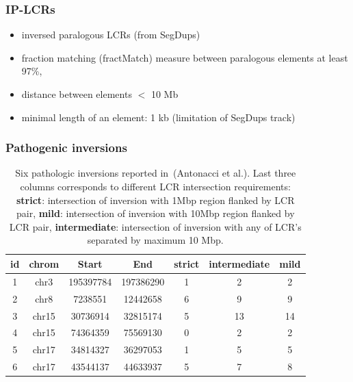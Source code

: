 \begin{frame}\frametitle{IP-LCRs}  
\begin{itemize}
 \item inversed paralogous LCRs (from SegDups)
 \item fraction matching (fractMatch) measure between paralogous elements at least 97\%, 
 \item distance between elements $<$ 10 Mb 
 \item minimal length of an element: 1 kb (limitation of SegDups track)
\end{itemize}
\end{frame}


\begin{frame}\frametitle{Pathogenic inversions}  
\begin{table}[t!]
\caption[Six pathologic inversions~ from~\cite{antonacci}]{Six pathologic inversions reported in~(Antonacci et al.). Last three columns corresponds to different LCR intersection requirements:
\textbf{strict}: intersection of inversion with 1Mbp region flanked by LCR pair, \textbf{mild}: intersection of inversion with 10Mbp region flanked by LCR pair, 
\textbf{intermediate}: intersection of inversion with any of LCR's separated by maximum 10 Mbp.
}
\label{t:six}
\begin{center}
\begin{tabular}{c|c|c|c|c|c|c}
id & chrom & Start & End & strict & intermediate  &mild \\\hline
1 & chr3 & 195397784 & 197386290 & 1 & 2 & 2\\\hline
2 & chr8 & 7238551 & 12442658 & 6 & 9 & 9\\\hline
3 & chr15 & 30736914 & 32815174 & 5 & 13 & 14\\\hline
4 & chr15 & 74364359 & 75569130  & 0 & 2 & 2\\\hline
5 & chr17 & 34814327 & 36297053 & 1 & 5 & 5\\\hline
6 & chr17 & 43544137 & 44633937  & 5 & 7 & 8\\
\end{tabular}
\end{center}
\end{table}
\end{frame}



